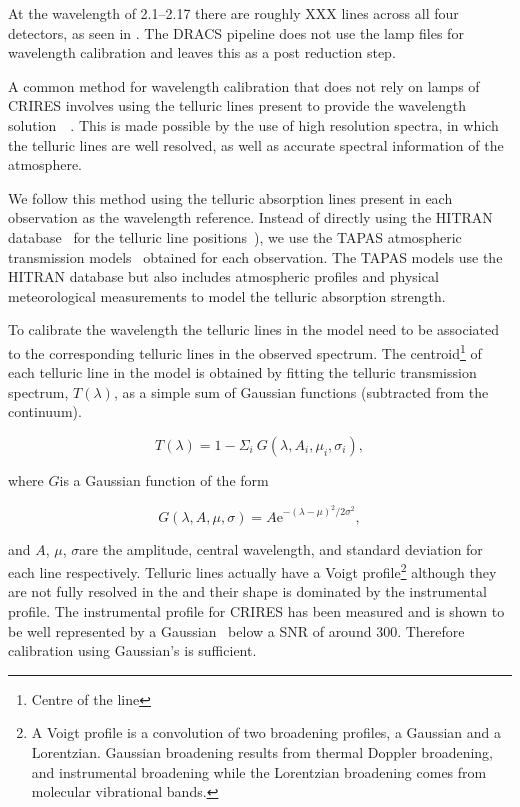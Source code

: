 At the wavelength of 2.1--2.17\um{} there are roughly XXX \thar{} lines across all four detectors, as seen in .
The DRACS pipeline does not use the \thar{} lamp files for wavelength calibration and leaves this as a post reduction step.

A common method for wavelength calibration that does not rely on \thar{} lamps of CRIRES involves using the telluric lines present to provide the wavelength solution~\citep[e.g.][]{brogi_signature_2012,brogi_carbon_2014,dekok_detection_2013}{\red{}~\citep{piskorz_evidence_2016}}.
This is made possible by the use of high resolution spectra, in which the telluric lines are well resolved, as well as accurate spectral information of the atmosphere.

We follow this method using the telluric absorption lines present in each observation as the wavelength reference. Instead of directly using the HITRAN database~\citep{rothman_hitran2012_2013} for the telluric line positions~\citet[such as in][]{brogi_signature_2012,brogi_carbon_2014,dekok_detection_2013}), we use the TAPAS atmospheric transmission models~\citep{bertaux_tapas_2014} obtained for each observation. The TAPAS models use the HITRAN database but also includes atmospheric profiles and physical meteorological measurements to model the telluric absorption strength.

To calibrate the wavelength the telluric lines in the model need to be associated to the corresponding telluric lines in the observed spectrum. The centroid\footnote{Centre of the line} of each telluric line in the model is obtained by fitting the telluric transmission spectrum, \(T(\lambda)\), as a simple sum of Gaussian functions (subtracted from the continuum).

\begin{equation}
T(\lambda) = 1 - {\Sigma}_{i}\ G(\lambda, A_{i}, {\mu}_{i}, {\sigma}_{i}),
\end{equation}

where \(G\)is a Gaussian function of the form

\begin{equation}
G(\lambda, A, \mu, \sigma) = {A \textrm{e}}^{{-(\lambda-\mu)}^{2}/2\sigma^{2}},
\end{equation}

and \(A\), \(\mu\), \(\sigma\)are the amplitude, central wavelength, and standard deviation for each line respectively. Telluric lines actually have a Voigt profile\footnote{A Voigt profile is a convolution of two broadening profiles, a Gaussian and a Lorentzian. Gaussian broadening results from thermal Doppler broadening, and instrumental broadening while the Lorentzian broadening comes from molecular vibrational bands\citep{meier_art_2005}.} although they are not fully resolved in the \nir{} and their shape is dominated by the instrumental profile. The instrumental profile for CRIRES  has been measured and is shown to be well represented by a Gaussian~\citep{seifahrt_synthesising_2010} below a SNR of around 300. Therefore calibration using Gaussian's is sufficient.

